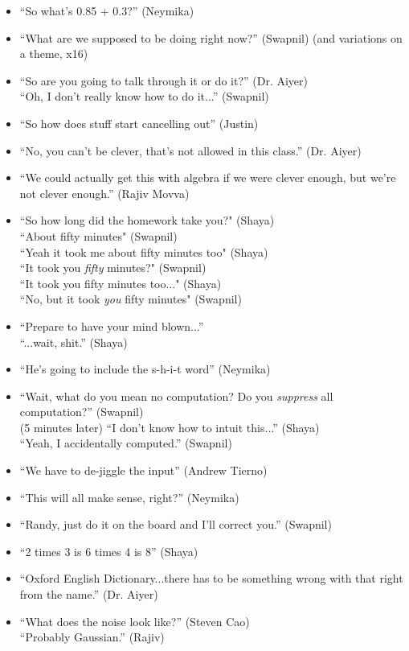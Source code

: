 \documentclass[11pt]{article}
\theoremstyle{definition}
\begin{document}
\begin{itemize}
\item ``So what's 0.85 + 0.3?'' (Neymika)
\item ``What are we supposed to be doing right now?'' (Swapnil) (and variations on a theme, x16)
\item ``So are you going to talk through it or do it?'' (Dr. Aiyer) \\ ``Oh, I don't really know how to do it...'' (Swapnil)
\item ``So how does stuff start cancelling out'' (Justin)
\item ``No, you can't be clever, that's not allowed in this class.'' (Dr. Aiyer)
\item ``We could actually get this with algebra if we were clever enough, but we’re not clever enough.'' (Rajiv Movva)
\item ``So how long did the homework take you?" (Shaya) \\ ``About fifty minutes" (Swapnil) \\ ``Yeah it took me about fifty minutes too" (Shaya) \\ ``It took you \textit{fifty} minutes?" (Swapnil) \\ ``It took you fifty minutes too..." (Shaya) \\ ``No, but it took \textit{you} fifty minutes" (Swapnil)
\item ``Prepare to have your mind blown...'' \\ ``...wait, shit.'' (Shaya)
\item ``He's going to include the s-h-i-t word'' (Neymika)
\item ``Wait, what do you mean no computation? Do you \textit{suppress} all computation?'' (Swapnil) \\ (5 minutes later) ``I don't know how to intuit this...'' (Shaya) \\ ``Yeah, I accidentally computed.'' (Swapnil)
\item ``We have to de-jiggle the input'' (Andrew Tierno) 
\item ``This will all make sense, right?'' (Neymika) 
\item ``Randy, just do it on the board and I'll correct you.'' (Swapnil)
\item ``2 times 3 is 6 times 4 is 8'' (Shaya)
\item ``Oxford English Dictionary...there has to be something wrong with that right from the name.'' (Dr. Aiyer)
\item ``What does the noise look like?'' (Steven Cao) \\ ``Probably Gaussian.'' (Rajiv)

\end{itemize}
\end{document}
